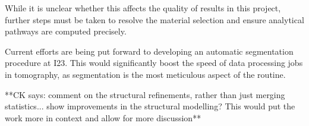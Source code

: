 While it is unclear whether this affects the quality of results in this project, further steps must be taken to resolve the material selection and ensure analytical pathways are computed precisely.

Current efforts are being put forward to developing an automatic segmentation procedure at I23. This would significantly boost the speed of data processing jobs in tomography, as segmentation is the most meticulous aspect of the routine.

**CK says: comment on the structural refinements, rather than just merging statistics... show improvements in the structural modelling? This would put the work more in context and allow for more discussion**



